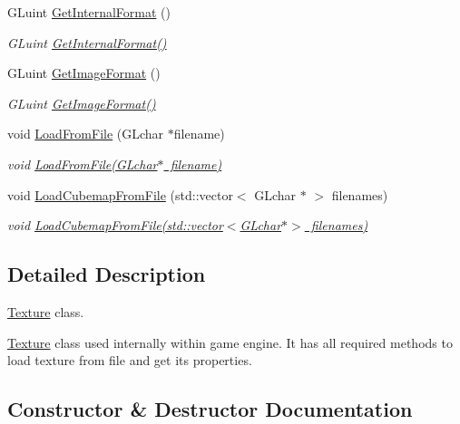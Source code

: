 \begin{DoxyCompactItemize}
G\+Luint \mbox{\hyperlink{class_texture_a8a45061cc3ef1c5de2ac8a0977658de1}{Get\+Internal\+Format}} ()
\begin{DoxyCompactList}\small\item\em G\+Luint \mbox{\hyperlink{class_texture_a8a45061cc3ef1c5de2ac8a0977658de1}{Get\+Internal\+Format()}} \end{DoxyCompactList}\item 
G\+Luint \mbox{\hyperlink{class_texture_afac89e6e43962939aa13a289e2386fd9}{Get\+Image\+Format}} ()
\begin{DoxyCompactList}\small\item\em G\+Luint \mbox{\hyperlink{class_texture_afac89e6e43962939aa13a289e2386fd9}{Get\+Image\+Format()}} \end{DoxyCompactList}\item 
void \mbox{\hyperlink{class_texture_a26134f37b4a22ff895686533937ba218}{Load\+From\+File}} (G\+Lchar $\ast$filename)
\begin{DoxyCompactList}\small\item\em void \mbox{\hyperlink{class_texture_a26134f37b4a22ff895686533937ba218}{Load\+From\+File(\+G\+Lchar$\ast$ filename)}} \end{DoxyCompactList}\item 
void \mbox{\hyperlink{class_texture_a056053b6bb3b6ed3bb44a624f0fb62c7}{Load\+Cubemap\+From\+File}} (std\+::vector$<$ G\+Lchar $\ast$ $>$ filenames)
\begin{DoxyCompactList}\small\item\em void \mbox{\hyperlink{class_texture_a056053b6bb3b6ed3bb44a624f0fb62c7}{Load\+Cubemap\+From\+File(std\+::vector$<$\+G\+Lchar$\ast$$>$ filenames)}} \end{DoxyCompactList}\end{DoxyCompactItemize}


\subsection{Detailed Description}
\mbox{\hyperlink{class_texture}{Texture}} class. 

\mbox{\hyperlink{class_texture}{Texture}} class used internally within game engine. It has all required methods to load texture from file and get it\textquotesingle{}s properties. 

\subsection{Constructor \& Destructor Documentation}
\mbox{\label{class_texture_a6c275e3f186675ff6ed73ccf970e552f}} 

